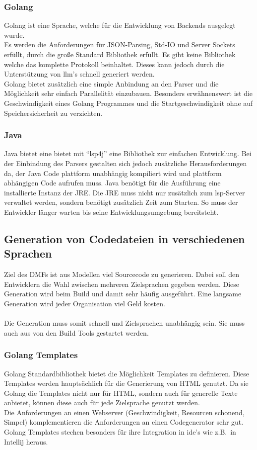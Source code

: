 \documentclass[./einleitung.tex]{subfiles}
\begin{document}
\subsubsection{Golang}
Golang ist eine Sprache, welche für die Entwicklung von Backends ausgelegt wurde. \\
Es werden die Anforderungen für JSON-Parsing, Std-IO und Server Sockets erfüllt, durch die große Standard Bibliothek erfüllt.
Es gibt keine Bibliothek welche das komplette Protokoll beinhaltet.
Dieses kann jedoch durch die Unterstützung von \acrshort{llm}'s schnell generiert werden.\\
Golang bietet zusätzlich eine simple Anbindung an den Parser und die Möglichkeit sehr einfach Parallelität einzubauen.
Besonders erwähnenswert ist die Geschwindigkeit eines Golang Programmes und die Startgeschwindigkeit ohne auf Speichersicherheit zu verzichten.

\subsubsection{Java}
Java bietet eine bietet mit ``lsp4j'' eine Bibliothek zur einfachen Entwicklung.
Bei der Einbindung des Parsers gestalten sich jedoch zusätzliche Herausforderungen da, der Java Code plattform unabhängig kompiliert wird und plattform abhängigen Code aufrufen muss.
Java benötigt für die Ausführung eine installierte Instanz der JRE. Die JRE muss nicht nur zusätzlich zum \acrlong{lsp}-Server verwaltet werden, sondern benötigt zusätzlich Zeit zum Starten.
So muss der Entwickler länger warten bis seine Entwicklungsumgebung bereitsteht.


\subsection{Generation von Codedateien in verschiedenen Sprachen}
Ziel des DMFs ist aus Modellen viel Sourcecode zu generieren.
Dabei soll den Entwicklern die Wahl zwischen mehreren Zielsprachen gegeben werden.
Diese Generation wird beim Build und damit sehr häufig ausgeführt.
Eine langsame Generation wird jeder Organisation viel Geld kosten.
\\\\
Die Generation muss somit schnell und Zielsprachen unabhängig sein.
Sie muss auch aus von den Build Tools gestartet werden.

\subsubsection{Golang Templates}
Golang Standardbibliothek bietet die Möglichkeit Templates zu definieren.
Diese Templates werden hauptsächlich für die Generierung von HTML genutzt.
Da sie Golang die Templates nicht nur für HTML, sondern auch für generelle Texte anbietet, können diese auch für jede Zielsprache genutzt werden. \\
Die Anforderungen an einen Webserver (Geschwindigkeit, Resourcen schonend, Simpel) komplementieren die Anforderungen an einen Codegenerator sehr gut. \\
Golang Templates stechen besonders für ihre Integration in \acrshort{ide}'s wie z.B.\ in Intellij heraus.
\end{document}
